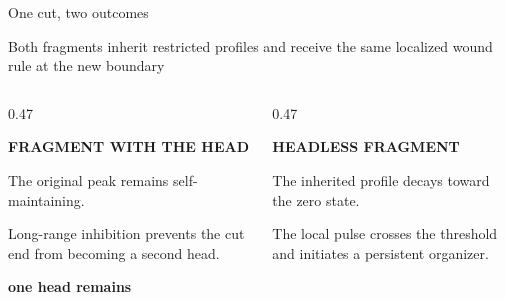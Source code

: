 \begin{frame}{One cut, two outcomes}

  \vspace{-0.12cm}

  \begin{center}
    {\color{HydraMuted}\fontsize{7.8}{9.4}\selectfont
      Both fragments inherit restricted profiles and receive the same localized wound rule at the new boundary
    \par}
  \end{center}

  \vspace{0.10cm}

  \begin{columns}[T,onlytextwidth]
    \begin{column}{0.47\textwidth}
      {\centering\color{HydraGold}\bfseries\fontsize{11.6}{14}\selectfont
        FRAGMENT WITH THE HEAD\par}

      \vspace{0.20cm}

        {The original peak remains self-maintaining.}

      \vspace{-0.12cm}

        {Long-range inhibition prevents the cut end from becoming a second head.}

      \vspace{-0.12cm}

      {\centering\color{HydraWhite}\bfseries\fontsize{11.4}{14}\selectfont
        one head remains
      \par}
    \end{column}

    \begin{column}{0.47\textwidth}
      {\centering\color{HydraCyan}\bfseries\fontsize{11.6}{14}\selectfont
        HEADLESS FRAGMENT\par}

      \vspace{0.20cm}

        {The inherited profile decays toward the zero state.}

      \vspace{-0.12cm}

        {The local pulse crosses the threshold and initiates a persistent organizer.}


\end{column}
\end{columns}
\end{frame}

